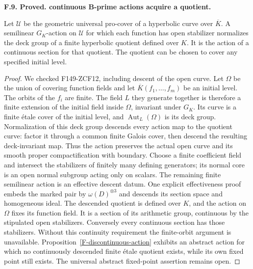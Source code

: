 \documentclass[11pt,oneside]{article}
\makeatletter
\newcounter{statementanchor}
\newenvironment{statement}[3]{%
 \refstepcounter{statementanchor}\def\@currentlabel{#1}%
 \par\addvspace{9pt}\noindent
 \textbf{#1. #2. #3.}\par\nobreak\noindent\ignorespaces
}{\par\addvspace{5pt}}
\makeatother
\begin{document}
\begin{statement}{F.9}{Proved}{continuous B-prime actions acquire a quotient}
\label{st:F.9}
\label{F-continuous-action}
Let $\mathcal U$ be the geometric universal pro-cover of a hyperbolic
curve over $\overline K$. A semilinear $G_K$-action on $\mathcal U$
for which each function has open stabilizer normalizes the deck
group of a finite hyperbolic quotient defined over $K$. It is the
action of a continuous section for that quotient. The quotient can
be chosen to cover any specified initial level.
\end{statement}
\begin{proof}
We checked F149-ZCF12, including descent of the open curve. Let
$\Omega$ be the union of covering function fields and let
$\overline K(f_1,\ldots,f_m)$ be an initial level. The orbits of
the $f_i$ are finite. The field $L$ they generate together is
therefore a finite extension of the initial field inside $\Omega$,
invariant under $G_K$. Its curve is a finite \'etale cover of the
initial level, and $\operatorname{Aut}_L(\Omega)$ is its deck group.
Normalization of this deck group descends every action map to
the quotient curve: factor it through a common finite Galois
cover, then descend the resulting deck-invariant map. Thus the
action preserves the actual open curve and its smooth proper
compactification with boundary. Choose a finite coefficient field
and intersect the stabilizers of finitely many defining generators;
its normal core is an open normal subgroup acting only on scalars.
The remaining finite semilinear action is an effective descent
datum. One explicit effectiveness proof embeds the marked pair
by $\omega(D)^{\otimes3}$ and descends its section space and
homogeneous ideal. The descended quotient is defined over $K$,
and the action on $\Omega$ fixes its function field. It is a
section of its arithmetic group, continuous by the stipulated
open stabilizers. Conversely every continuous section has those
stabilizers. Without this continuity requirement the finite-orbit
argument is unavailable. Proposition~\ref{F-discontinuous-action}
exhibits an abstract action for which no continuously descended
finite \'etale quotient exists, while its own fixed point still
exists. The universal abstract fixed-point assertion remains open.
\end{proof}
\end{document}
